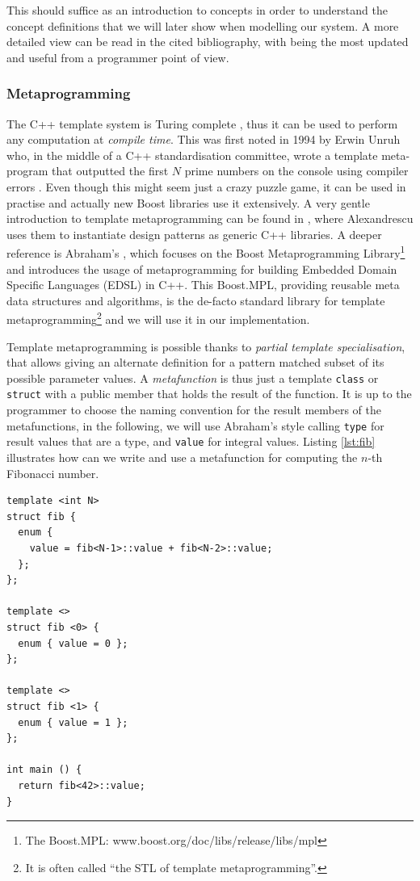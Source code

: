 This should suffice as an introduction to concepts in order to
understand the concept definitions that we will later show when
modelling our system. A more detailed view can be read in the cited
bibliography, with \cite{jarvi10concept} being the most updated and
useful from a programmer point of view.

\subsubsection{Metaprogramming}

The C++ template system is Turing complete
\cite{veldhuizen03templates}, thus it can be used to perform any
computation at \emph{compile time}. This was first noted in 1994 by
Erwin Unruh who, in the middle of a C++ standardisation committee,
wrote a template meta-program that outputted the first $N$ prime
numbers on the console using compiler errors \cite{unruh94prime}. Even
though this might seem just a crazy puzzle game, it can be used in
practise and actually new Boost libraries use it extensively. A very
gentle introduction to template metaprogramming can be found in
\cite{alexandrescu01modern}, where Alexandrescu uses them to
instantiate design patterns as generic C++ libraries. A deeper
reference is Abraham's \cite{abrahams04meta}, which focuses on the
Boost Metaprogramming Library\footnote{The Boost.MPL:
  www.boost.org/doc/libs/release/libs/mpl} and introduces the usage of
metaprogramming for building Embedded Domain Specific Languages (EDSL)
in C++. This Boost.MPL, providing reusable meta data structures and
algorithms, is the de-facto standard library for template
metaprogramming\footnote{It is often called ``the STL of template
  metaprogramming''.} and we will use it in our implementation.

Template metaprogramming is possible thanks to \emph{partial template
  specialisation}, that allows giving an alternate definition for a
pattern matched subset of its possible parameter values. A
\emph{metafunction} is thus just a template \texttt{class} or
\texttt{struct} with a public member that holds the result of the
function. It is up to the programmer to choose the naming convention
for the result members of the metafunctions, in the following, we will
use Abraham's style calling \texttt{type} for result values that are a
type, and \texttt{value} for integral values. Listing \ref{lst:fib}
illustrates how can we write and use a metafunction for computing the
$n$-th Fibonacci number.

\begin{lstlisting}[float=h!, 
  caption=Metaprogram for computing the Nth Fibonacci number,
  label=lst:fib]
template <int N>
struct fib {
  enum { 
    value = fib<N-1>::value + fib<N-2>::value; 
  };
};

template <>
struct fib <0> {
  enum { value = 0 };
};

template <>
struct fib <1> {
  enum { value = 1 };
};

int main () {
  return fib<42>::value;
}  
\end{lstlisting}

